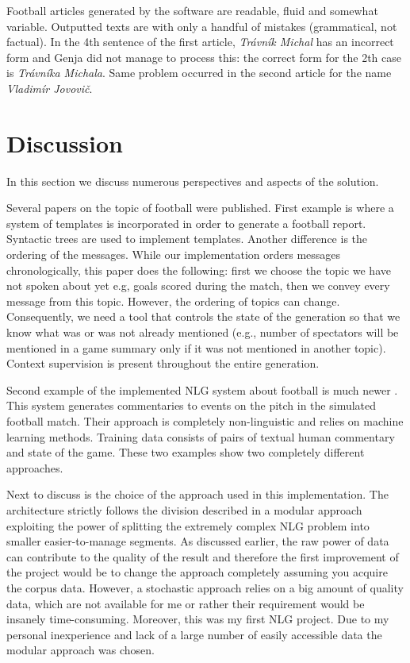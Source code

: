 Football articles generated by the software are readable, fluid and somewhat variable. Outputted texts are with only a handful of mistakes (grammatical, not factual). In the 4th sentence of the first article, \textit{Trávník Michal} has an incorrect form and Genja did not manage to process this: the correct form for the 2th case is \textit{Trávníka Michala}. Same problem occurred in the second article for the name \textit{Vladimír Jovovič}. 

\section{Discussion}
In this section we discuss numerous perspectives and aspects of the solution.

Several papers on the topic of football were published. First example is \cite{et1997generation} where a system of templates is incorporated in order to generate a  football report. Syntactic trees are used to implement templates. Another difference is the ordering of the messages. While our implementation orders messages chronologically, this paper does the following: first we choose the topic we have not spoken about yet e.g, goals scored during the match, then we convey every message from this topic.  However, the ordering of topics can change. Consequently, we need a tool that controls the state of the generation so that we know what was or was not already mentioned (e.g., number of spectators will be mentioned in a game summary only if it was not mentioned in another topic). Context supervision is present throughout the entire generation.

Second example of the implemented NLG system about football is much newer \cite{chen2008learning}. This system generates commentaries to events on the pitch in the simulated football match. Their approach is completely non-linguistic and relies on machine learning methods. Training data consists of pairs of textual human commentary and state of the game. These two examples show two completely different approaches.

Next to discuss is the choice of the approach used in this implementation. The architecture strictly follows the division described in a modular approach exploiting the power of splitting the extremely complex NLG problem into smaller easier-to-manage segments. As discussed earlier, the raw power of data can contribute to the quality of the result and therefore the first improvement of the project would be to change the approach completely assuming you acquire the corpus data. However, a stochastic approach relies on a big amount of quality data, which are not available for me or rather their requirement would be insanely time-consuming. Moreover, this was my first NLG project. Due to my personal inexperience and lack of a large number of easily accessible data the modular approach was chosen.

